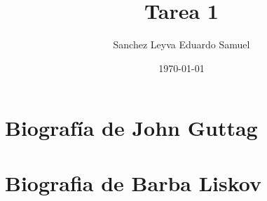 \documentclass{article}
\title{Tarea 1}
\author{Sanchez Leyva Eduardo Samuel}
\date{\today}
\begin{document}
\maketitle

\section{Biografía de John Guttag}
\section{Biografia de Barba Liskov}
\end{document}
